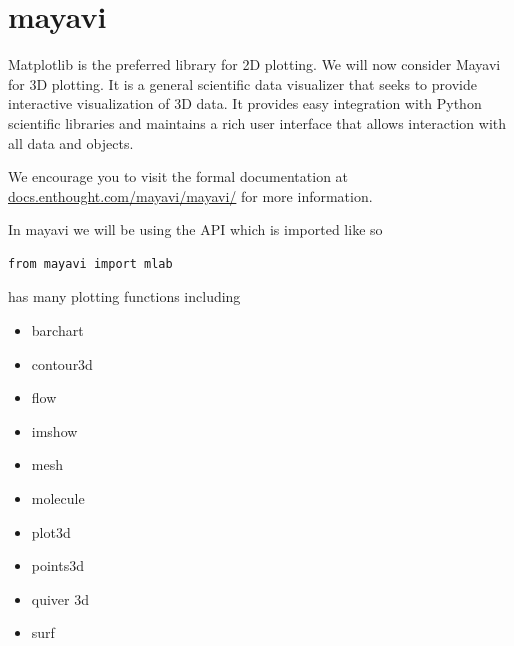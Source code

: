 \section*{mayavi}
Matplotlib is the preferred library for 2D plotting. We will now
consider Mayavi for 3D plotting. It is a general scientific data
visualizer that seeks to provide interactive visualization of 3D data.
It provides easy integration with Python scientific libraries and
maintains a rich user interface that allows interaction with all data
and objects.

We encourage you to visit the formal documentation at
\url{docs.enthought.com/mayavi/mayavi/} for more information. 

In mayavi we will be using the  API which is imported like so
\begin{lstlisting}
from mayavi import mlab
\end{lstlisting}

 has many plotting functions including
\begin{itemize}
\item barchart
\item contour3d
\item flow
\item imshow
\item mesh
\item molecule
\item plot3d
\item points3d
\item quiver 3d
\item surf
\end{itemize}

